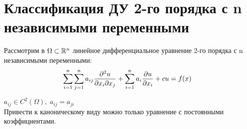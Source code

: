 \documentclass[../main.tex]{subfiles}
\begin{document}
\section{Классификация ДУ 2-го порядка с n независимыми переменными}

\par Рассмотрим в $\Omega \subset \mathbb{R}^n $ линейное дифференциальное уравнение 2-го порядка с n независимыми переменными:
\begin{equation}\label{eq:1.8.1}
	\sum_{i=1}^n\sum_{j=1}^n a_{ij}\frac{\partial^2u}{\partial x_i \partial x_j} + \sum_{i=1}^n a_i \frac{\partial u}{\partial x_i} + cu = f(x)
 \end{equation}

$a_{ij} \in C^2(\Omega), \; a_{ij} = a_{ji} $
\\
Привести к каноническому виду можно только уравнение с постоянными коэффициентами.
\end{document}
